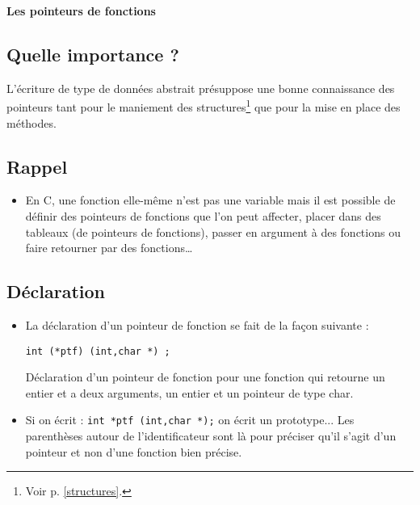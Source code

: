 \centerline{\Large\bf Les pointeurs de fonctions}
\label{Fonction}
 
\noindent\hrulefill  

\subsection*{Quelle importance ?}

L'\'ecriture de type de donn\'ees abstrait pr\'esuppose une bonne connaissance des 
pointeurs tant pour le maniement des structures\footnote{Voir p.
\ref{structures}.} que pour la mise en place des m\'ethodes.

\subsection*{Rappel}
    
	\begin{itemize} 

    \item  En C, une fonction elle-m\^eme n'est pas une variable mais il est
      possible de d\'efinir des pointeurs de fonctions que l'on peut 
      affecter, placer dans des tableaux (de pointeurs de fonctions), 
      passer en argument \`a des fonctions ou faire
	  retourner par des fonctions\ldots

	  \end{itemize} 

\subsection*{D\'eclaration}

	\begin{itemize} 

    \item  La d\'eclaration d'un pointeur de fonction se fait de la fa\c con suivante :

      {\tt int    (*ptf) (int,char *) ;}

      D\'eclaration d'un pointeur de fonction pour une fonction qui retourne
      un entier et a deux arguments, un entier et un pointeur de type char.

    \item Si on \'ecrit :  {\tt int *ptf (int,char *);} on \'ecrit un
	      prototype...  Les parenth\`eses autour de l'identificateur
	      sont l\`a pour pr\'eciser qu'il s'agit d'un pointeur et non
	      d'une fonction bien pr\'ecise.

	 \end{itemize} 

